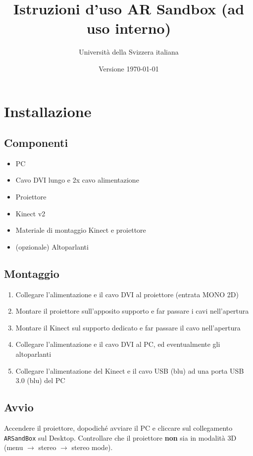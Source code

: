 \documentclass[12pt]{article}
\title{Istruzioni d'uso AR Sandbox (ad uso interno)}
\author{Università della Svizzera italiana}
\date{Versione \today}
\begin{document}
\maketitle
\tableofcontents
\newpage


\section{Installazione}\label{installation}	

	\subsection{Componenti}
	
		\begin{itemize}
			\item PC
			\item Cavo DVI lungo e 2x cavo alimentazione
			\item Proiettore
			\item Kinect v2
			\item Materiale di montaggio Kinect e proiettore
			\item (opzionale) Altoparlanti
		\end{itemize}
		
		
	\subsection{Montaggio}
	
		\begin{enumerate}
			\item Collegare l'alimentazione e il cavo DVI al proiettore (entrata MONO 2D)
			\item Montare il proiettore sull'apposito supporto e far passare i cavi
			nell'apertura
			\item Montare il Kinect sul supporto dedicato e far passare il cavo nell'apertura
			\item Collegare l'alimentazione e il cavo DVI al PC, ed eventualmente gli altoparlanti
			\item Collegare l'alimentazione del Kinect e il cavo USB (blu) ad una porta USB 3.0 (blu) del PC
		\end{enumerate}
		
		
	\subsection{Avvio}

		Accendere il proiettore, dopodiché avviare il PC e cliccare sul collegamento
		\texttt{ARSandBox} sul Desktop. Controllare che il proiettore \textbf{non} sia in modalità 3D
		(menu $\rightarrow$ stereo $\rightarrow$ stereo mode).
		
\end{document}
